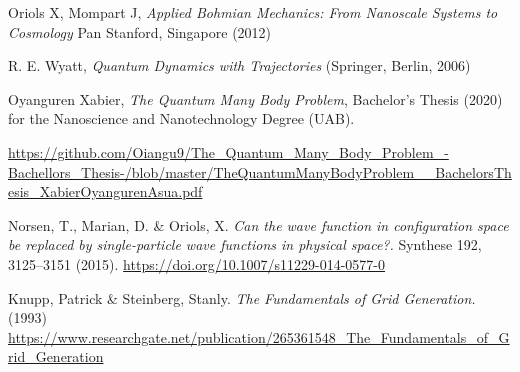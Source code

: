\documentclass[11pt, a4paper]{article} %
\begin{document}
 


\begin{thebibliography}{1}

	Oriols X, Mompart J, {\em Applied Bohmian Mechanics: From Nanoscale Systems to Cosmology} Pan Stanford, Singapore (2012)
	

R. E. Wyatt, {\em Quantum Dynamics with Trajectories} (Springer, Berlin, 2006)


	Oyanguren Xabier, {\em The Quantum Many Body Problem}, Bachelor's Thesis (2020) for the Nanoscience and Nanotechnology Degree (UAB).

\href{https://github.com/Oiangu9/The\_Quantum\_Many\_Body\_Problem\_-Bachellors\_Thesis-/blob/master/TheQuantumManyBodyProblem\_\_BachelorsThesis\_XabierOyangurenAsua.pdf}{https://github.com/Oiangu9/The\_Quantum\_Many\_Body\_Problem\_-Bachellors\_Thesis-/blob/master/TheQuantumManyBodyProblem\_\_BachelorsThesis\_XabierOyangurenAsua.pdf}

Norsen, T., Marian, D. \& Oriols, X. {\em Can the wave function in configuration space be replaced by single-particle wave functions in physical space?.} Synthese 192, 3125–3151 (2015). \href{https://doi.org/10.1007/s11229-014-0577-0}{https://doi.org/10.1007/s11229-014-0577-0}


Knupp, Patrick \& Steinberg, Stanly. {\em The Fundamentals of Grid Generation.} (1993) \href{https://www.researchgate.net/publication/265361548_The_Fundamentals_of_Grid_Generation}{https://www.researchgate.net/publication/265361548\_The\_Fundamentals\_of\_Grid\_Generation} 


	
\end{thebibliography}
\end{document}
